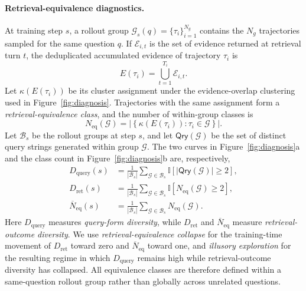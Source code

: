 \documentclass[letterpaper]{article} %
\begin{document}
\paragraph{Retrieval-equivalence diagnostics.}
At training step \(s\), a rollout group \(\mathcal{G}_s(q)=\{\tau_i\}_{i=1}^{N_g}\) contains the \(N_g\) trajectories sampled for the same question \(q\).
If \(\mathcal{E}_{i,t}\) is the set of evidence returned at retrieval turn \(t\), the deduplicated accumulated evidence of trajectory \(\tau_i\) is
\begin{equation}
E(\tau_i)=\bigcup_{t=1}^{T_i}\mathcal{E}_{i,t}.
\end{equation}
Let \(\kappa(E(\tau_i))\) be its cluster assignment under the evidence-overlap clustering used in Figure~\ref{fig:diagnosis}.
Trajectories with the same assignment form a \emph{retrieval-equivalence class}, and the number of within-group classes is
\begin{equation}
N_{\mathrm{eq}}(\mathcal{G})
=\left|\left\{\kappa(E(\tau_i)):\tau_i\in\mathcal{G}\right\}\right|.
\end{equation}
Let \(\mathcal{B}_s\) be the rollout groups at step \(s\), and let \(\mathsf{Qry}(\mathcal{G})\) be the set of distinct query strings generated within group \(\mathcal{G}\).
The two curves in Figure~\ref{fig:diagnosis}a and the class count in Figure~\ref{fig:diagnosis}b are, respectively,
\begin{align}
D_{\mathrm{query}}(s)
&=\frac{1}{|\mathcal{B}_s|}\sum_{\mathcal{G}\in\mathcal{B}_s}
\mathbb{I}[|\mathsf{Qry}(\mathcal{G})|\geq2],\\
D_{\mathrm{ret}}(s)
&=\frac{1}{|\mathcal{B}_s|}\sum_{\mathcal{G}\in\mathcal{B}_s}
\mathbb{I}[N_{\mathrm{eq}}(\mathcal{G})\geq2],\\
\overline N_{\mathrm{eq}}(s)
&=\frac{1}{|\mathcal{B}_s|}\sum_{\mathcal{G}\in\mathcal{B}_s}
N_{\mathrm{eq}}(\mathcal{G}).
\end{align}
Here \(D_{\mathrm{query}}\) measures \emph{query-form diversity}, while \(D_{\mathrm{ret}}\) and \(\overline N_{\mathrm{eq}}\) measure \emph{retrieval-outcome diversity}.
We use \emph{retrieval-equivalence collapse} for the training-time movement of \(D_{\mathrm{ret}}\) toward zero and \(\overline N_{\mathrm{eq}}\) toward one, and \emph{illusory exploration} for the resulting regime in which \(D_{\mathrm{query}}\) remains high while retrieval-outcome diversity has collapsed.
All equivalence classes are therefore defined within a same-question rollout group rather than globally across unrelated questions.
\end{document}
